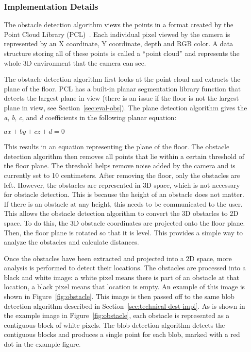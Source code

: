 \subsubsection{Implementation Details}
\label{sec:technical-obs-impl}

The obstacle detection algorithm views the points in a format created by the
Point Cloud Library (PCL)~\cite{pcl-website}. Each individual pixel viewed by
the camera is represented by an X coordinate, Y coordinate, depth and RGB color.
A data structure storing all of these points is called a ``point cloud'' and
represents the whole 3D environment that the camera can see.

The obstacle detection algorithm first looks at the point cloud and extracts the
plane of the floor. PCL has a built-in planar segmentation library function that
detects the largest plane in view (there is an issue if the floor is not the
largest plane in view, see Section~\ref{sec:eval-obs}).
The plane detection algorithm gives the \emph{a}, \emph{b}, \emph{c}, and
\emph{d} coefficients in the following planar equation:

\begin{math}
ax + by + cz + d = 0
\end{math}

This results in an equation representing the plane of the floor. The obstacle
detection algorithm then removes all points that lie within a certain threshold
of the floor plane. The threshold helps remove noise added by the camera and is
currently set to 10 centimeters. After removing the floor, only the obstacles
are left. However, the obstacles are represented in 3D space, which is not
necessary for obstacle detection. This is because the height of an obstacle does
not matter. If there is an obstacle at any height, this needs to be
communicated to the user. This allows the obstacle detection algorithm to
convert the 3D obstacles to 2D space. To do this, the 3D obstacle coordinates
are projected onto the floor plane. Then, the floor plane is rotated so that it
is level. This provides a simple way to analyze the obstacles and calculate
distances.

Once the obstacles have been extracted and projected into a 2D space, more
analysis is performed to detect their locations. The obstacles are processed
into a black and white image: a white pixel means there is part of an obstacle
at that location, a black pixel means that location is empty. An example of this
image is shown in Figure~\ref{fig:obstacle}. This image is then
passed off to the same blob detection algorithm described in Section~\ref{sec:technical-dest-impl}.
As is shown in the example image in
Figure~\ref{fig:obstacle}, each obstacle is represented as a contiguous block
of white pixels. The blob detection algorithm detects the contiguous blocks and
produces a single point for each blob, marked with a red dot in the example
figure.

